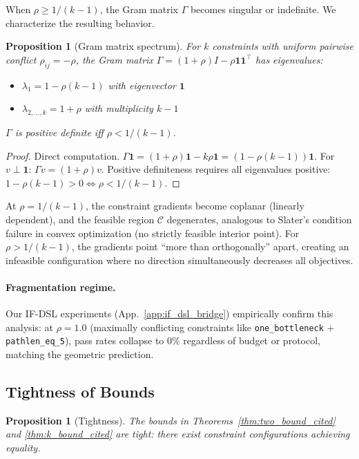 \documentclass{article}
\theoremstyle{plain}
\newtheorem{proposition}[theorem]{Proposition}
\theoremstyle{definition}
\theoremstyle{remark}
\newcommand{\appref}[1]{App.~\ref{#1}}
\begin{document}
When $\rho \ge 1/(k-1)$, the Gram matrix $\Gamma$ becomes singular or indefinite. We characterize the resulting behavior.

\begin{proposition}[Gram matrix spectrum]\label{prop:gram_spectrum}
For $k$ constraints with uniform pairwise conflict $\rho_{ij} = -\rho$, the Gram matrix $\Gamma = (1+\rho)I - \rho\mathbf{1}\mathbf{1}^\top$ has eigenvalues:
\begin{itemize}
    \item $\lambda_1 = 1 - \rho(k-1)$ with eigenvector $\mathbf{1}$
    \item $\lambda_{2,\ldots,k} = 1 + \rho$ with multiplicity $k-1$
\end{itemize}
$\Gamma$ is positive definite iff $\rho < 1/(k-1)$.
\end{proposition}

\begin{proof}
Direct computation. $\Gamma\mathbf{1} = (1+\rho)\mathbf{1} - k\rho\mathbf{1} = (1-\rho(k-1))\mathbf{1}$.
For $v \perp \mathbf{1}$: $\Gamma v = (1+\rho)v$.
Positive definiteness requires all eigenvalues positive: $1-\rho(k-1) > 0 \Leftrightarrow \rho < 1/(k-1)$.
\end{proof}

At $\rho = 1/(k-1)$, the constraint gradients become coplanar (linearly dependent), and the feasible region $\mathcal{C}$ degenerates, analogous to Slater's condition failure in convex optimization (no strictly feasible interior point). For $\rho > 1/(k-1)$, the gradients point ``more than orthogonally'' apart, creating an infeasible configuration where no direction simultaneously decreases all objectives.

\paragraph{Fragmentation regime.}
Our IF-DSL experiments (\appref{app:if_dsl_bridge}) empirically confirm this analysis: at $\rho = 1.0$ (maximally conflicting constraints like \texttt{one\_bottleneck} + \texttt{pathlen\_eq\_5}), pass rates collapse to 0\% regardless of budget or protocol, matching the geometric prediction.

\subsection{Tightness of Bounds}\label{app:tightness}

\begin{proposition}[Tightness]
The bounds in Theorems~\ref{thm:two_bound_cited} and \ref{thm:k_bound_cited} are tight: there exist constraint configurations achieving equality.
\end{proposition}
\end{document}
